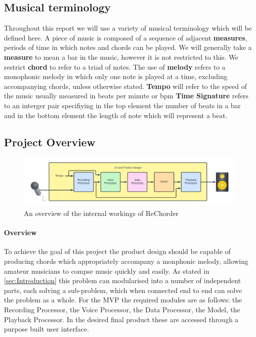 \subsection{Musical terminology}

Throughout this report we will use a variety of musical terminology which will be defined here. A piece of music is composed of a sequence of adjacent \textbf{measures}, periods of time in which notes and chords can be played. 
We will generally take a \textbf{measure} to mean a bar in the music, however it is not restricted to this. We restrict \textbf{chord} to refer to a triad of notes.%
The use of \textbf{melody} refers to a monophonic melody in which only one note is played at a time, excluding accompanying chords, unless otherwise stated.
\textbf{Tempo} will refer to the speed of the music usually measured in beats per minute or bpm
\textbf{Time Signature} refers to an interger pair specifiying in the top element the number of beats in a bar and in the bottom element the length of note which will represent a beat.


\subsection{Project Overview}
\begin{figure}
    \centering
    \includegraphics[width=0.8\columnwidth]{Figures/Project Overview}
    \decoRule
    \caption[]{An overview of the internal workings of ReChorder}
    \label{fig:MVPOverview}
\end{figure}

\paragraph{Overview}
To achieve the goal of this project the product design should be capable of producing chords which appropriately accompany a monphonic melody, allowing amateur musicians to compse music quickly and easily.
As stated in \ref{sec:Introduction} this problem can modularised into a number of independent parts, each solving a sub-problem, which when connected end to end can solve the problem as a whole.
For the MVP the required modules are as follows: the Recording Processor, the Voice Processor, the Data Processor, the Model, the Playback Processor.
In the desired final product these are accessed through a purpose built user interface.

